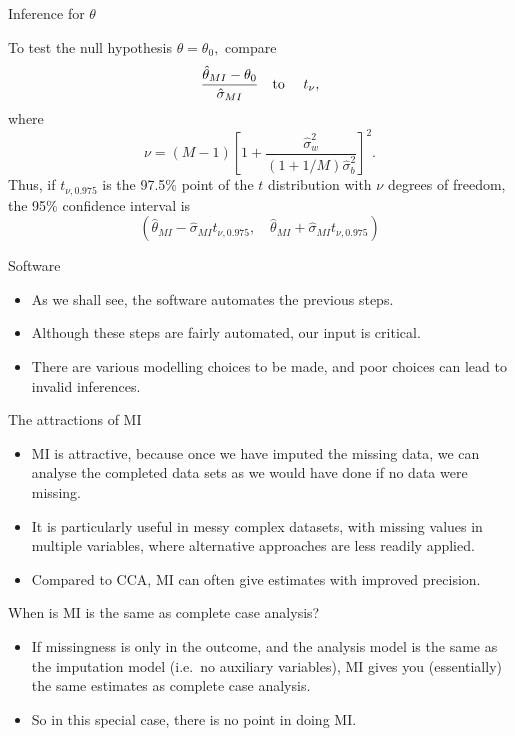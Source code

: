 \documentclass[ignorenonframetext,]{beamer}
\providecommand{\tightlist}{%
  \setlength{\itemsep}{0pt}\setlength{\parskip}{0pt}}
\begin{document}
\begin{frame}{Inference for \(\theta\)}
\protect\hypertarget{inference-for-theta}{}

To test the null hypothesis \(\theta=\theta_0,\) compare
\[ \frac{\hat\theta_{MI} - \theta_0}{\hat\sigma_{MI}} \mbox{\quad to \quad} t_\nu,\]
where
\[\nu = (M-1) \left[ 1 + \frac{ \hat\sigma^2_w}{(1 + 1/M)\hat\sigma^2_b}\right]^2.\]
Thus, if \(t_{\nu,0.975}\) is the 97.5\% point of the \(t\) distribution
with \(\nu\) degrees of freedom, the 95\% confidence interval is
\[(\hat\theta_{MI}-\hat\sigma_{MI} t_{\nu,0.975},\quad \hat\theta_{MI}+\hat\sigma_{MI} t_{\nu,0.975})\]

\end{frame}

\begin{frame}{Software}
\protect\hypertarget{software}{}

\begin{itemize}
\tightlist
\item
  As we shall see, the software automates the previous steps.
\item
  Although these steps are fairly automated, our input is critical.
\item
  There are various modelling choices to be made, and poor choices can
  lead to invalid inferences.
\end{itemize}

\end{frame}

\begin{frame}{The attractions of MI}
\protect\hypertarget{the-attractions-of-mi}{}

\begin{itemize}
\tightlist
\item
  MI is attractive, because once we have imputed the missing data, we
  can analyse the completed data sets as we would have done if no data
  were missing.
\item
  It is particularly useful in messy complex datasets, with missing
  values in multiple variables, where alternative approaches are less
  readily applied.
\item
  Compared to CCA, MI can often give estimates with improved precision.
\end{itemize}

\end{frame}

\begin{frame}{When is MI is the same as complete case analysis?}
\protect\hypertarget{when-is-mi-is-the-same-as-complete-case-analysis}{}

\begin{itemize}
\tightlist
\item
  If missingness is only in the outcome, and the analysis model is the
  same as the imputation model (i.e.~no auxiliary variables), MI gives
  you (essentially) the same estimates as complete case analysis.
\item
  So in this special case, there is no point in doing MI.
\end{itemize}

\end{frame}
\end{document}
